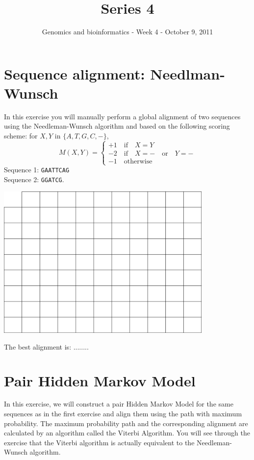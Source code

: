 \documentclass[a4paper,11pt]{article}
\title{Series 4}
\date{}
\author{Genomics and bioinformatics - Week 4 - October 9, 2011}
\begin{document}
\maketitle


\section{Sequence alignment: Needlman-Wunsch}
In this exercise you will manually perform a global alignment of two sequences using the
Needleman-Wunsch algorithm and based on the following scoring scheme: for $X,Y$ in $\{A,T,G,C,-\}$, 
$$
M(X,Y) = \left\{ 
\begin{array}{l}
	+1 \quad\text{if}\quad X = Y \\
	-2 \quad\text{if}\quad X = - \quad\text{or}\quad Y = - \\
	-1 \quad \text{otherwise}
\end{array} \right.
$$
Sequence 1: \texttt{GAATTCAG}\\
Sequence 2: \texttt{GGATCG}.
\vspace{0.5cm}
\begin{center}
\includegraphics[width=0.8\textwidth]{matrix.png}
\end{center}
\vspace{0.5cm}

The best alignment is: ........\\

\newpage 

\section{Pair Hidden Markov Model}

In this exercise, we will construct a pair Hidden Markov Model for
the same sequences as in the first exercise and align them using the
path with maximum probability. The maximum probability path and the 
corresponding alignment are calculated by an algorithm called the Viterbi Algorithm. 
You will see through the exercise that the Viterbi algorithm is actually equivalent
to the Needleman-Wunsch algorithm.
\end{document}
